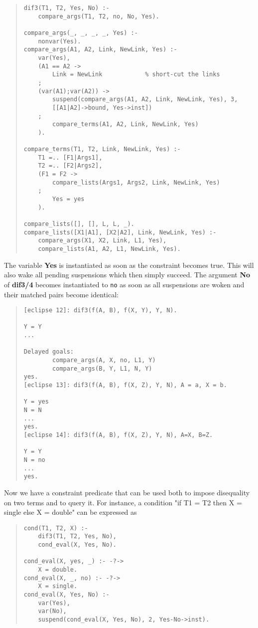 \begin{quote}
\begin{verbatim}
dif3(T1, T2, Yes, No) :-
    compare_args(T1, T2, no, No, Yes).

compare_args(_, _, _, _, Yes) :-
    nonvar(Yes).
compare_args(A1, A2, Link, NewLink, Yes) :-
    var(Yes),
    (A1 == A2 ->
        Link = NewLink            % short-cut the links
    ;
    (var(A1);var(A2)) ->
        suspend(compare_args(A1, A2, Link, NewLink, Yes), 3, 
	    [[A1|A2]->bound, Yes->inst])
    ;
        compare_terms(A1, A2, Link, NewLink, Yes)
    ).

compare_terms(T1, T2, Link, NewLink, Yes) :-
    T1 =.. [F1|Args1],
    T2 =.. [F2|Args2],
    (F1 = F2 ->
        compare_lists(Args1, Args2, Link, NewLink, Yes)
    ;
        Yes = yes
    ).

compare_lists([], [], L, L, _).
compare_lists([X1|A1], [X2|A2], Link, NewLink, Yes) :-
    compare_args(X1, X2, Link, L1, Yes),
    compare_lists(A1, A2, L1, NewLink, Yes).
\end{verbatim}
\end{quote}

The variable {\bf Yes} is instantiated as soon as the constraint
becomes true.
This will also wake all pending suspensions which then simply succeed.
The argument {\bf No} of {\bf dif3/4} becomes instantiated to {\tt no}
as soon as all suspensions are woken and their matched pairs
become identical:

\begin{quote}
\begin{verbatim}
[eclipse 12]: dif3(f(A, B), f(X, Y), Y, N).

Y = Y
...

Delayed goals:
        compare_args(A, X, no, L1, Y)
        compare_args(B, Y, L1, N, Y)
yes.
[eclipse 13]: dif3(f(A, B), f(X, Z), Y, N), A = a, X = b.

Y = yes
N = N
...
yes.
[eclipse 14]: dif3(f(A, B), f(X, Z), Y, N), A=X, B=Z.

Y = Y
N = no
...
yes.
\end{verbatim}
\end{quote}

Now we have a constraint predicate that can be used both to impose
disequality on two terms and to query it.
For instance, a condition "if T1 = T2 then X = single else X = double"
can be expressed as
\begin{quote}
\begin{verbatim}
cond(T1, T2, X) :-
    dif3(T1, T2, Yes, No),
    cond_eval(X, Yes, No).

cond_eval(X, yes, _) :- -?->
    X = double.
cond_eval(X, _, no) :- -?->
    X = single.
cond_eval(X, Yes, No) :-
    var(Yes),
    var(No),
    suspend(cond_eval(X, Yes, No), 2, Yes-No->inst).
\end{verbatim}
\end{quote}

